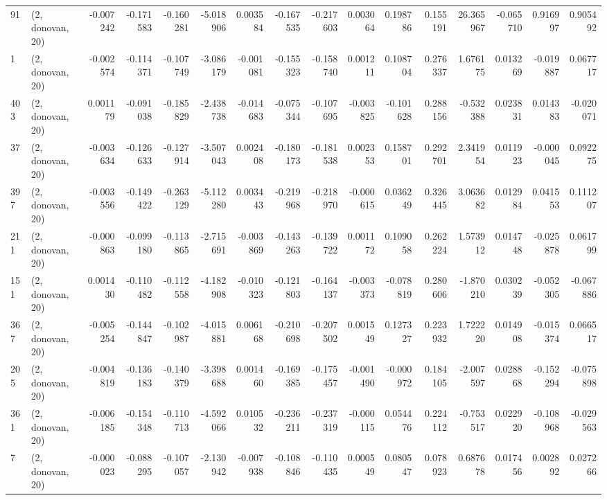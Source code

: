 \begin{tabular}{llrrrrrrrrrrrrrr}
91  &  (2, donovan, 20) &  -0.007242 & -0.171583 & -0.160281 &   -5.018906 &  0.003584 &  -0.167535 & -0.217603 &  0.003064 &  0.198786 &  0.155191 &   26.365967 & -0.065710 &  0.916997 &  0.905492 \\
1   &  (2, donovan, 20) &  -0.002574 & -0.114371 & -0.107749 &   -3.086179 & -0.001081 &  -0.155323 & -0.158740 &  0.001211 &  0.108704 &  0.276337 &    1.676175 &  0.013269 & -0.019887 &  0.067717 \\
403 &  (2, donovan, 20) &   0.001179 & -0.091038 & -0.185829 &   -2.438738 & -0.014683 &  -0.075344 & -0.107695 & -0.003825 & -0.101628 &  0.288156 &   -0.532388 &  0.023831 &  0.014383 & -0.020071 \\
37  &  (2, donovan, 20) &  -0.003634 & -0.126633 & -0.127914 &   -3.507043 &  0.002408 &  -0.180173 & -0.181538 &  0.002353 &  0.158701 &  0.292701 &    2.341954 &  0.011923 & -0.000045 &  0.092275 \\
397 &  (2, donovan, 20) &  -0.003556 & -0.149422 & -0.263129 &   -5.112280 &  0.003443 &  -0.219968 & -0.218970 & -0.000615 &  0.036249 &  0.326445 &    3.063682 &  0.012984 &  0.041553 &  0.111207 \\
211 &  (2, donovan, 20) &  -0.000863 & -0.099180 & -0.113865 &   -2.715691 & -0.003869 &  -0.143263 & -0.139722 &  0.001172 &  0.109058 &  0.262224 &    1.573912 &  0.014748 & -0.025878 &  0.061799 \\
151 &  (2, donovan, 20) &   0.001430 & -0.110482 & -0.112558 &   -4.182908 & -0.010323 &  -0.121803 & -0.164137 & -0.003373 & -0.078819 &  0.280606 &   -1.870210 &  0.030239 & -0.052305 & -0.067886 \\
367 &  (2, donovan, 20) &  -0.005254 & -0.144847 & -0.102987 &   -4.015881 &  0.006168 &  -0.210698 & -0.207502 &  0.001549 &  0.127327 &  0.223932 &    1.722220 &  0.014908 & -0.015374 &  0.066517 \\
205 &  (2, donovan, 20) &  -0.004819 & -0.136183 & -0.140379 &   -3.398688 &  0.001460 &  -0.169385 & -0.175457 & -0.001490 & -0.000972 &  0.184105 &   -2.007597 &  0.028868 & -0.152294 & -0.075898 \\
361 &  (2, donovan, 20) &  -0.006185 & -0.154348 & -0.110713 &   -4.592066 &  0.010532 &  -0.236211 & -0.237319 & -0.000115 &  0.054476 &  0.224112 &   -0.753517 &  0.022920 & -0.108968 & -0.029563 \\
7   &  (2, donovan, 20) &  -0.000023 & -0.088295 & -0.107057 &   -2.130942 & -0.007938 &  -0.108846 & -0.110435 &  0.000549 &  0.080547 &  0.078923 &    0.687678 &  0.017456 &  0.002892 &  0.027266 \\

\end{tabular}

